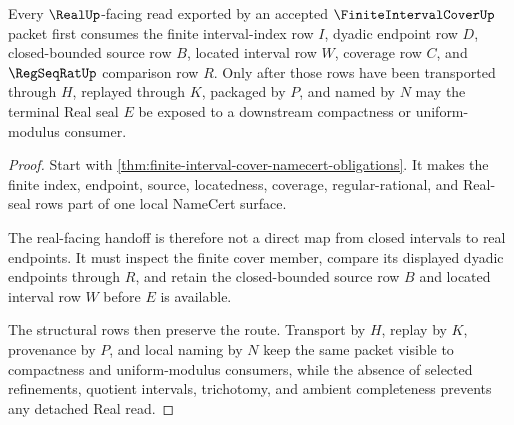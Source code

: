 \begin{theorem}
\label{thm:finite-interval-cover-real-handoff}
Every $\RealUp$-facing read exported by an accepted $\FiniteIntervalCoverUp$ packet first consumes the finite interval-index row $I$, dyadic endpoint row $D$, closed-bounded source row $B$, located interval row $W$, coverage row $C$, and $\RegSeqRatUp$ comparison row $R$. Only after those rows have been transported through $H$, replayed through $K$, packaged by $P$, and named by $N$ may the terminal Real seal $E$ be exposed to a downstream compactness or uniform-modulus consumer.
\end{theorem}
\begin{proof}
Start with \autoref{thm:finite-interval-cover-namecert-obligations}. It makes the finite index, endpoint, source, locatedness, coverage, regular-rational, and Real-seal rows part of one local NameCert surface.

The real-facing handoff is therefore not a direct map from closed intervals to real endpoints. It must inspect the finite cover member, compare its displayed dyadic endpoints through $R$, and retain the closed-bounded source row $B$ and located interval row $W$ before $E$ is available.

The structural rows then preserve the route. Transport by $H$, replay by $K$, provenance by $P$, and local naming by $N$ keep the same packet visible to compactness and uniform-modulus consumers, while the absence of selected refinements, quotient intervals, trichotomy, and ambient completeness prevents any detached Real read.
\end{proof}




